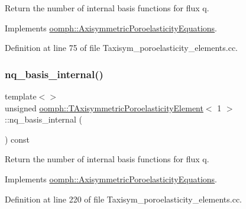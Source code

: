 Return the number of internal basis functions for flux q. 



Implements \hyperlink{classoomph_1_1AxisymmetricPoroelasticityEquations_afa7d0f89a144f2031959d750f7b3ebc1}{oomph\+::\+Axisymmetric\+Poroelasticity\+Equations}.



Definition at line 75 of file Taxisym\+\_\+poroelasticity\+\_\+elements.\+cc.

\mbox{\label{classoomph_1_1TAxisymmetricPoroelasticityElement_a712947a5033fb2b36f1aae345ff3b366}} 
\subsubsection{\texorpdfstring{nq\+\_\+basis\+\_\+internal()}{nq\_basis\_internal()}\hspace{0.1cm}{\footnotesize\ttfamily [2/3]}}
{\footnotesize\ttfamily template$<$$>$ \\
unsigned \hyperlink{classoomph_1_1TAxisymmetricPoroelasticityElement}{oomph\+::\+T\+Axisymmetric\+Poroelasticity\+Element}$<$ 1 $>$\+::nq\+\_\+basis\+\_\+internal (\begin{DoxyParamCaption}{ }\end{DoxyParamCaption}) const\hspace{0.3cm}{\ttfamily [virtual]}}



Return the number of internal basis functions for flux q. 



Implements \hyperlink{classoomph_1_1AxisymmetricPoroelasticityEquations_afa7d0f89a144f2031959d750f7b3ebc1}{oomph\+::\+Axisymmetric\+Poroelasticity\+Equations}.



Definition at line 220 of file Taxisym\+\_\+poroelasticity\+\_\+elements.\+cc.

\mbox{\label{classoomph_1_1TAxisymmetricPoroelasticityElement_adab98934a20e65055bdc477824c8c5ef}} 
